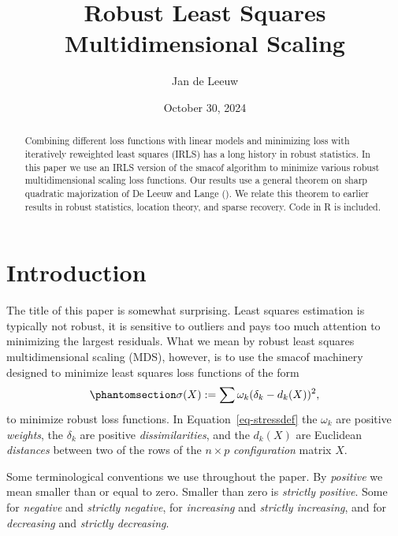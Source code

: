 \documentclass[
  12pt,
  letterpaper,
  DIV=11,
  numbers=noendperiod]{scrartcl}
\title{Robust Least Squares Multidimensional Scaling}
\author{Jan de Leeuw}
\date{October 30, 2024}
\newcommand{\sectionbreak}{\pagebreak}
\renewcommand*\contentsname{Table of contents}
\newcommand\contentsname{Table of contents}
\theoremstyle{plain}
\theoremstyle{plain}
\theoremstyle{plain}
\theoremstyle{definition}
\theoremstyle{definition}
\theoremstyle{remark}
\begin{document}
\maketitle
\begin{abstract}
Combining different loss functions with linear models and minimizing
loss with iteratively reweighted least squares (IRLS) has a long history
in robust statistics. In this paper we use an IRLS version of the smacof
algorithm to minimize various robust multidimensional scaling loss
functions. Our results use a general theorem on sharp quadratic
majorization of De Leeuw and Lange
(). We relate this theorem to
earlier results in robust statistics, location theory, and sparse
recovery. Code in R is included.
\end{abstract}

\renewcommand*\contentsname{Table of contents}
{
\hypersetup{linkcolor=}
\setcounter{tocdepth}{3}
\tableofcontents
}

\sectionbreak

\listoffigures

\sectionbreak

\section{Introduction}\label{sec-intro}

The title of this paper is somewhat surprising. Least squares estimation
is typically not robust, it is sensitive to outliers and pays too much
attention to minimizing the largest residuals. What we mean by robust
least squares multidimensional scaling (MDS), however, is to use the
smacof machinery designed to minimize least squares loss functions of
the form \begin{equation}\phantomsection\label{eq-stressdef}{
\sigma(X):=\sum\omega_k(\delta_k-d_k(X))^2,
}\end{equation} to minimize robust loss functions. In
Equation~\ref{eq-stressdef} the \(\omega_k\) are positive
\emph{weights}, the \(\delta_k\) are positive \emph{dissimilarities},
and the \(d_k(X)\) are Euclidean \emph{distances} between two of the
rows of the \(n\times p\) \emph{configuration} matrix \(X\).

Some terminological conventions we use throughout the paper. By
\emph{positive} we mean smaller than or equal to zero. Smaller than zero
is \emph{strictly positive}. Some for \emph{negative} and \emph{strictly
negative}, for \emph{increasing} and \emph{strictly increasing}, and for
\emph{decreasing} and \emph{strictly decreasing}.
\end{document}
